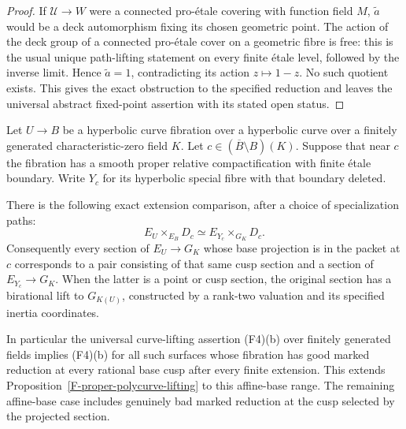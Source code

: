 \begin{proof}
If $\mathcal U\to W$ were a connected pro-\'etale
covering with function field $M$, $\widetilde a$ would
be a deck automorphism fixing its chosen geometric point.
The action of the deck group of a connected pro-\'etale
cover on a geometric fibre is free: this is the usual
unique path-lifting statement on every finite \'etale
level, followed by the inverse limit. Hence
$\widetilde a=1$, contradicting its action $z\mapsto1-z$.
No such quotient exists. This gives the exact obstruction
to the specified reduction and leaves the universal
abstract fixed-point assertion with its stated open status.
\end{proof}

\begin{proposition}
\label{F-good-boundary-lifting}
Let $U\to B$ be a hyperbolic curve fibration over a hyperbolic
curve over a finitely generated characteristic-zero field $K$.
Let $c\in(\overline B\setminus B)(K)$. Suppose that near $c$
the fibration has a smooth proper relative compactification
with finite \'etale boundary. Write $Y_c$ for its hyperbolic
special fibre with that boundary deleted.

There is the following exact extension comparison, after a
choice of specialization paths:
\[
 E_U\mathbin{\times}_{E_B}D_c
       \simeq E_{Y_c}\mathbin{\times}_{G_K}D_c.
 \tag{F.42.1}
\]
Consequently every section of $E_U\to G_K$ whose base
projection is in the packet at $c$ corresponds to a pair
consisting of that same cusp section and a section of
$E_{Y_c}\to G_K$. When the latter is a point or cusp
section, the original section has a birational lift to
$G_{K(U)}$, constructed by a rank-two valuation and its
specified inertia coordinates.

In particular the universal curve-lifting assertion (F4)(b)
over finitely generated fields implies (F4)(b) for all such
surfaces whose fibration has good marked reduction at every
rational base cusp after every finite extension. This extends
Proposition~\ref{F-proper-polycurve-lifting} to this affine-base
range. The remaining affine-base case includes genuinely bad
marked reduction at the cusp selected by the projected section.
\end{proposition}
